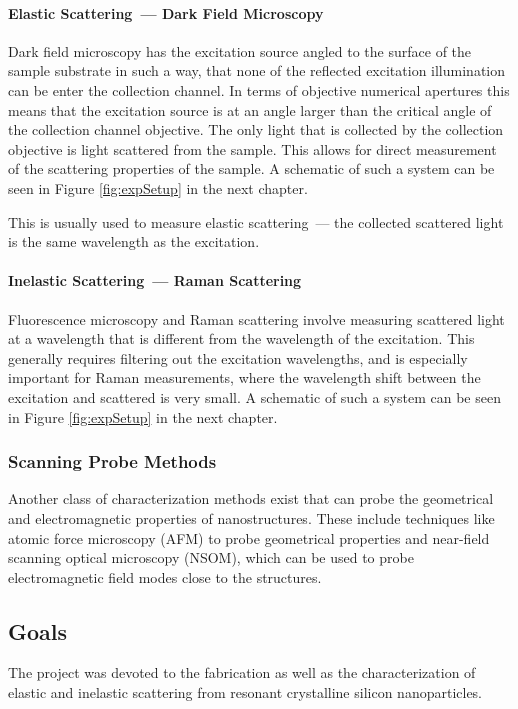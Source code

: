             \paragraph{Elastic Scattering~--- Dark Field Microscopy}
                    Dark field microscopy has the excitation source angled to the surface of the sample substrate in such a way, that none of
                the reflected excitation illumination can be enter the collection channel. In terms of objective numerical apertures this
                means that the excitation source is at an angle larger than the critical angle of the collection channel objective. The only
                light that is collected by the collection objective is light scattered from the sample. This allows for direct measurement of
                the scattering properties of the sample. A schematic of such a system can be seen in Figure \ref{fig:expSetup} in the next chapter.

                    This is usually used to measure elastic scattering~--- the collected scattered light is the same wavelength as the excitation.
            \paragraph{Inelastic Scattering~--- Raman Scattering}
                    Fluorescence microscopy and Raman scattering involve measuring scattered light at a wavelength that is different from the
                wavelength of the excitation. This generally requires filtering out the excitation wavelengths, and is especially
                important for Raman measurements, where the wavelength shift between the excitation and scattered is very small.
                A schematic of such a system can be seen in Figure \ref{fig:expSetup} in the next chapter.

        \subsubsection{Scanning Probe Methods}
        \label{sec:SPM}
                Another class of characterization methods exist that can probe the geometrical and electromagnetic properties of nanostructures.
            These include techniques like atomic force microscopy (AFM) to probe geometrical properties and near-field scanning
            optical microscopy (NSOM), which can be used to probe electromagnetic field modes close to the structures.

    \subsection{Goals}
            The project was devoted to the fabrication as well as the characterization of elastic and inelastic scattering from resonant crystalline
        silicon nanoparticles.

